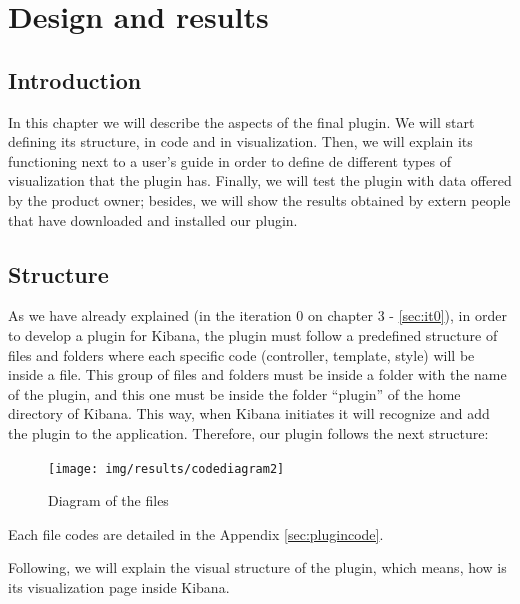 \documentclass[a4paper, 12pt]{book}
\begin{document}
\cleardoublepage
\chapter{Design and results}
\label{chap:dai}

\section{Introduction}
\label{sec:dint}

In this chapter we will describe the aspects of the final plugin. We will start defining its structure, in code and in visualization. Then, we will explain its functioning next to a user's guide in order to define de different types of visualization that the plugin has. Finally, we will test the plugin with data offered by the product owner; besides, we will show the results obtained by extern people that have downloaded and installed our plugin. 

\section{Structure}


As we have already explained (in the iteration 0 on chapter 3 - \ref{sec:it0}), in order to develop a plugin for Kibana, the plugin must follow a predefined structure of files and folders where each specific code (controller, template, style) will be inside a file. This group of files and folders must be inside a folder with the name of the plugin, and this one must be inside the folder “plugin” of the home directory of Kibana. This way, when Kibana initiates it will recognize and add the plugin to the application. Therefore, our plugin follows the next structure: 

\begin{figure}[H]
  \centering
  \texttt{[image: img/results/codediagram2]}
  \caption{Diagram of the files}
  \label{fig:codediagram}
\end{figure}

Each file codes are detailed in the Appendix \ref{sec:plugincode}. 

Following, we will explain the visual structure of the plugin, which means, how is its visualization page inside Kibana.
\end{document}
